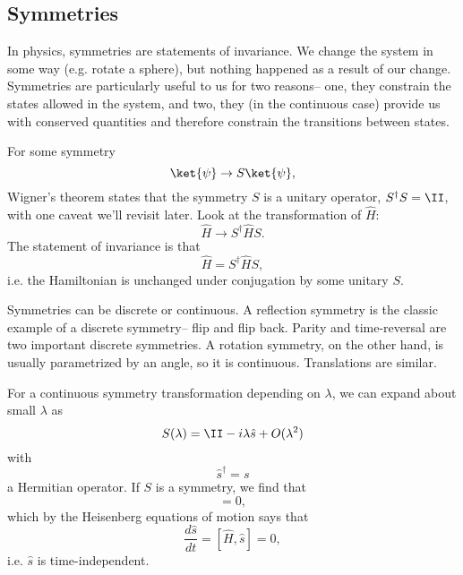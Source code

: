 \subsection*{Symmetries}
In physics, symmetries are statements of invariance. We change the system in some way (e.g. rotate a sphere), but nothing happened as a result of our change. Symmetries are particularly useful to us for two reasons-- one, they constrain the states allowed in the system, and two, they (in the continuous case) provide us with conserved quantities and therefore constrain the transitions between states.

For some symmetry
\begin{equation}
    \ket{\psi} \to S \ket{\psi},
\end{equation}
Wigner's theorem states that the symmetry $S$ is a unitary operator, $S^\dagger S = \II$, with one caveat we'll revisit later. Look at the transformation of $\hat H$:
\begin{equation}
    \hat H  \to S^\dagger \hat H S.
\end{equation}
The statement of invariance is that
\begin{equation}
    \hat H = S^\dagger \hat H S,
\end{equation}
i.e. the Hamiltonian is unchanged under conjugation by some unitary $S$.

Symmetries can be discrete or continuous. A reflection symmetry is the classic example of a discrete symmetry-- flip and flip back. Parity and time-reversal are two important discrete symmetries. A rotation symmetry, on the other hand, is usually parametrized by an angle, so it is continuous. Translations are similar.

For a continuous symmetry transformation depending on $\lambda$, we can expand about small $\lambda$ as
\begin{equation}
    S(\lambda) = \II - i\lambda \hat s + O(\lambda^2)
\end{equation}
with
\begin{equation}
    \hat s^\dagger = s
\end{equation}
a Hermitian operator. If $S$ is a symmetry, we find that
\begin{equation}
    [\hat H, \hat s]=0,
\end{equation}
which by the Heisenberg equations of motion says that
\begin{equation}
    \frac{d\hat s}{dt} = [\hat H, \hat s]=0,
\end{equation}
i.e. $\hat s$ is time-independent.

